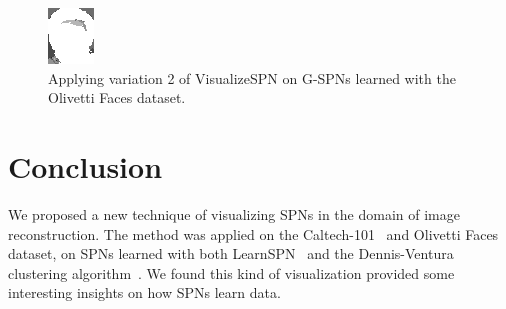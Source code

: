\documentclass{article}
\begin{document}
\begin{figure}[t]
\begin{minipage}[c]{.21\linewidth}
    \centering\centerline{\includegraphics[width=\linewidth]{imgs/gens_oliv/0/sums/8_2.png}}
  \end{minipage}
  \caption{Applying variation 2 of VisualizeSPN on G-SPNs learned with the Olivetti Faces dataset.
  \label{fig:g-oliv}}
\end{figure}

\section{Conclusion}
\label{sec:conc}

We proposed a new technique of visualizing SPNs in the domain of image reconstruction. The method
was applied on the Caltech-101~\cite{fei04} and Olivetti Faces~\cite{samaria94} dataset, on SPNs
learned with both LearnSPN~\cite{gens13} and the Dennis-Ventura clustering
algorithm~\cite{dennis12}. We found this kind of visualization provided some interesting insights
on how SPNs learn data.




\end{document}
